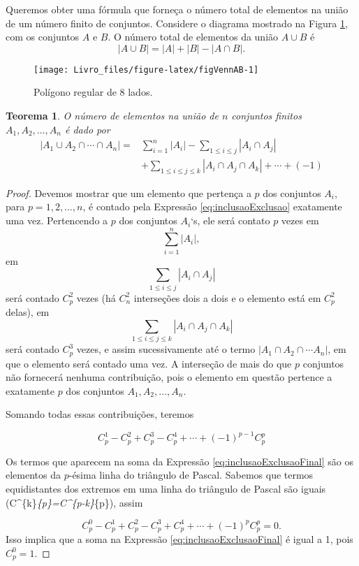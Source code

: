 \documentclass[]{book}
\newtheorem{theorem}{Teorema}[chapter]
\theoremstyle{definition}
\theoremstyle{definition}
\theoremstyle{definition}
\theoremstyle{remark}
\begin{document}
Queremos obter uma fórmula que forneça o número total de elementos na união de um número finito de conjuntos.
Considere o diagrama mostrado na Figura \ref{fig:figVennAB}, com os conjuntos \(A\) e \(B\).
O número total de elementos da união \(A \cup B\) é
\[|A\cup B| = |A| + |B| - |A\cap B|.\]

\begin{figure}

{\centering \texttt{[image: Livro\_files/figure-latex/figVennAB-1]} 

}

\caption{Polígono regular de 8 lados.}\label{fig:figVennAB}
\end{figure}

\begin{theorem}
\protect\hypertarget{thm:teoPrincInclExcl}{}{\label{thm:teoPrincInclExcl} }O número de elementos na união de \(n\) conjuntos finitos \(A_1, A_2, \ldots, A_n\) é dado por
\begin{align}
|A_1 \cup A_2 \cap \cdots \cap A_n| = &\sum_{i=1}^{n} |A_i| - \sum_{1\leq i\leq j} |A_i \cap A_j|\\
  &+ \sum_{1\leq i\leq j\leq k} |A_i \cap A_j \cap A_k| + \cdots + (-1)
\label{eq:inclusaoExclusao}
\end{align}
\end{theorem}

\begin{proof}
\iffalse{} {Prova. } \fi{}Devemos mostrar que um elemento que pertença a \(p\) dos conjuntos \(A_i\), para \(p=1,2,\ldots, n\), é contado pela Expressão \eqref{eq:inclusaoExclusao} exatamente uma vez.
Pertencendo a \(p\) dos conjuntos \(A_i\)`s, ele será contato \(p\) vezes em
\[\sum_{i=1}^{n} |A_i|,\]
em
\[\sum_{1\leq i\leq j} |A_i \cap A_j|\]
será contado \(C^2_p\) vezes (há \(C^2_n\) interseções dois a dois e o elemento está em \(C^2_p\) delas),
em
\[\sum_{1\leq i\leq j\leq k} |A_i \cap A_j \cap A_k|\]
será contado \(C^3_p\) vezes, e assim sucessivamente até o termo \(|A_1 \cap A_2 \cap \cdots A_n|\), em que o elemento será contado uma vez.
A interseção de mais do que \(p\) conjuntos não fornecerá nenhuma contribuição, pois o elemento em questão pertence a exatamente \(p\) dos conjuntos \(A_1, A_2, \ldots, A_n\).

Somando todas essas contribuições, teremos

\begin{equation}
C^{1}_{p}-C^{2}_{p}+C^{3}_{p}-C^{4}_{p}+\cdots +(-1)^{p-1}C^{p}_{p}
\label{eq:inclusaoExclusaoFinal}
\end{equation}

Os termos que aparecem na soma da Expressão \eqref{eq:inclusaoExclusaoFinal} são os elementos da \(p\)-ésima linha do triângulo de Pascal.
Sabemos que termos equidistantes dos extremos em uma linha do triângulo de Pascal são iguais (C\^{}\{k\}\emph{\{p\}=C\^{}\{p-k\}}\{p\}), assim

\[C^{0}_{p}-C^{1}_{p}+C^{2}_{p}-C^{3}_{p}+C^{4}_{p}+\cdots +(-1)^{p}C^{p}_{p} = 0.\]
Isso implica que a soma na Expressão \eqref{eq:inclusaoExclusaoFinal} é igual a 1, pois \(C^{0}_{p}=1\).
\end{proof}
\end{document}
